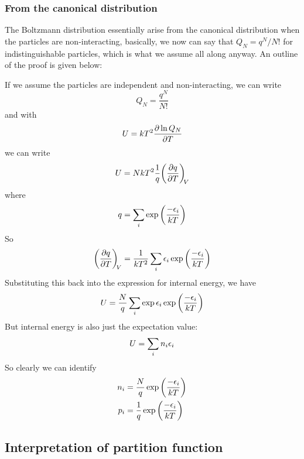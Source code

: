 \subsubsection{From the canonical distribution}
The Boltzmann distribution essentially arise from the canonical distribution when the particles are non-interacting, basically, we now can say that $Q_N=q^N/N!$ for indistinguishable particles, which is what we assume all along anyway. An outline of the proof is given below:\par
If we assume the particles are independent and non-interacting, we can write
\begin{equation}
  Q_N=\frac{q^N}{N!}
\end{equation}
and with 
\begin{equation}
  U=kT^2\diffp {\ln Q_N}{T}
\end{equation}
we can write
\begin{equation}
  U=NkT^2\frac{1}{q}\diffp qT[V]
\end{equation}
where 
\begin{equation}
  q=\sum_i\exp \left(\frac{-\epsilon_i}{kT} \right)
\end{equation}
So 
\begin{equation}
  \diffp qT[V]=\frac{1}{kT^2}\sum_i\ep_i\exp \lf(\frac{-\ep_i}{kT} \rt)
\end{equation}
Substituting this back into the expression for internal energy, we have
\begin{equation}
  U=\frac{N}{q}\sum_i\exp\epsilon_i\exp \left(\frac{-\epsilon_i}{kT} \right)
\end{equation}
But internal energy is also just the expectation value:
\begin{equation}
  U=\sum_i n_i\epsilon_i
\end{equation}
So clearly we can identify
\begin{equation}
\begin{aligned}
  n_i&=\frac{N}{q}\exp \left(\frac{-\epsilon_i}{kT} \right)\\
  p_i&=\frac{1}{q}\exp \left(\frac{-\epsilon_i}{kT} \right)
\end{aligned}
\end{equation}
\subsection{Interpretation of partition function}
